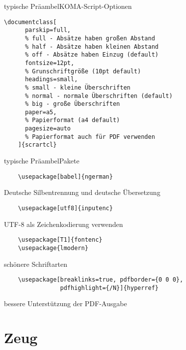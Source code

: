 \begin{Frame}[fragile]{typische Präambel}{KOMA-Script-Optionen}
  \begin{lstlisting}[gobble=4]
    \documentclass[
      parskip=full,
      % full - Absätze haben großen Abstand
      % half - Absätze haben kleinen Abstand
      % off - Absätze haben Einzug (default)
      fontsize=12pt,
      % Grunschriftgröße (10pt default)
      headings=small,
      % small - kleine Überschriften
      % normal - normale Überschriften (default)
      % big - große Überschriften
      paper=a5,
      % Papierformat (a4 default)
      pagesize=auto
      % Papierformat auch für PDF verwenden
    ]{scrartcl}
  \end{lstlisting}
\end{Frame}

\begin{Frame}[fragile]{typische Präambel}{Pakete}
  \begin{lstlisting}
    \usepackage[babel]{ngerman}
  \end{lstlisting}
  Deutsche Silbentrennung und deutsche Übersetzung
  \begin{lstlisting}
    \usepackage[utf8]{inputenc}
  \end{lstlisting}
  UTF-8 als Zeichenkodierung verwenden
  \begin{lstlisting}
    \usepackage[T1]{fontenc}
    \usepackage{lmodern}
  \end{lstlisting}
  schönere Schriftarten
  \begin{lstlisting}
    \usepackage[breaklinks=true, pdfborder={0 0 0},
                pdfhighlight={/N}]{hyperref}
  \end{lstlisting}
  bessere Unterstützung der PDF-Ausgabe
\end{Frame}

\section{Zeug}

\newcommand{\icon}[1]{%
  \tikz\draw[very thick, line join=round]
    (-.5,.5) -- ++(.7,0) -- ++(.3,-.3) --
    ++(-.3,0) -- ++(0,.3) -- ++(.3,-.3) -- ++(0,-.8) -- ++(-1,0) -- cycle
    ++ (0,-.3) node[fill, text=white,
      inner sep=2pt, minimum width=8mm, anchor=center] {#1}
    ++ (.1,-.3) -- ++(.8,0) -- ++(0,-.1)
    -- ++(-.8,0) -- ++(0,-.1)
    -- ++(.8,0) -- ++(0,-.1)
    -- ++(-.8,0) -- ++(0,-.1)
    -- ++(.8,0);
  }

